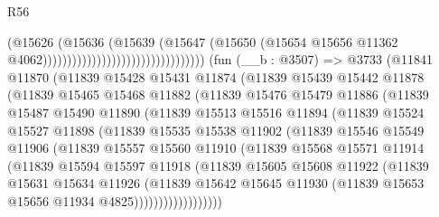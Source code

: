 \begin{lexlean}{R56}
\begin{coremodule}
                                                          (@15626
                                                            (@15636
                                                              (@15639
                                                                (@15647
                                                                  (@15650
                                                                    (@15654
                                                                      @15656
                                                                      @11362
                                                                      @4062)))))))))))))))))))))))))))))))))
    (fun (__b : @3507) =>
    @3733
      (@11841
        @11870
        (@11839
          @15428
          @15431
          @11874
          (@11839
            @15439
            @15442
            @11878
            (@11839
              @15465
              @15468
              @11882
              (@11839
                @15476
                @15479
                @11886
                (@11839
                  @15487
                  @15490
                  @11890
                  (@11839
                    @15513
                    @15516
                    @11894
                    (@11839
                      @15524
                      @15527
                      @11898
                      (@11839
                        @15535
                        @15538
                        @11902
                        (@11839
                          @15546
                          @15549
                          @11906
                          (@11839
                            @15557
                            @15560
                            @11910
                            (@11839
                              @15568
                              @15571
                              @11914
                              (@11839
                                @15594
                                @15597
                                @11918
                                (@11839
                                  @15605
                                  @15608
                                  @11922
                                  (@11839
                                    @15631
                                    @15634
                                    @11926
                                    (@11839
                                      @15642
                                      @15645
                                      @11930
                                      (@11839 @15653 @15656 @11934 @4825))))))))))))))))))

\end{coremodule}
\end{lexlean}
